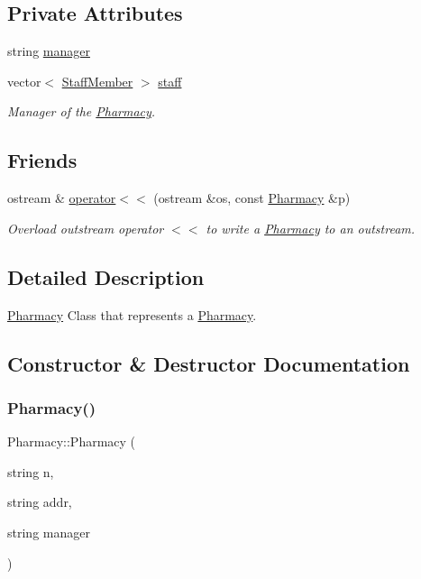\subsection*{Private Attributes}
\begin{DoxyCompactItemize}
\item 
string \hyperlink{classPharmacy_a620e101128be08b27f4401d53cfc39e6}{manager}
\item 
vector$<$ \hyperlink{classStaffMember}{Staff\+Member} $>$ \hyperlink{classPharmacy_a5b515f5ef98dc2babdc48b8c937688a9}{staff}
\begin{DoxyCompactList}\small\item\em Manager of the \hyperlink{classPharmacy}{Pharmacy}. \end{DoxyCompactList}\end{DoxyCompactItemize}
\subsection*{Friends}
\begin{DoxyCompactItemize}
\item 
ostream \& \hyperlink{classPharmacy_aa75a7da96c11bdada029ebe3ecb397d6}{operator$<$$<$} (ostream \&os, const \hyperlink{classPharmacy}{Pharmacy} \&p)
\begin{DoxyCompactList}\small\item\em Overload outstream operator $<$$<$ to write a \hyperlink{classPharmacy}{Pharmacy} to an outstream. \end{DoxyCompactList}\end{DoxyCompactItemize}


\subsection{Detailed Description}
\hyperlink{classPharmacy}{Pharmacy} Class that represents a \hyperlink{classPharmacy}{Pharmacy}. 

\subsection{Constructor \& Destructor Documentation}
\mbox{\label{classPharmacy_ad12ac7a309d2e77742508ecc7bee4453}} 
\subsubsection{\texorpdfstring{Pharmacy()}{Pharmacy()}\hspace{0.1cm}{\footnotesize\ttfamily [1/2]}}
{\footnotesize\ttfamily Pharmacy\+::\+Pharmacy (\begin{DoxyParamCaption}\item[{string}]{n,  }\item[{string}]{addr,  }\item[{string}]{manager }\end{DoxyParamCaption})}



